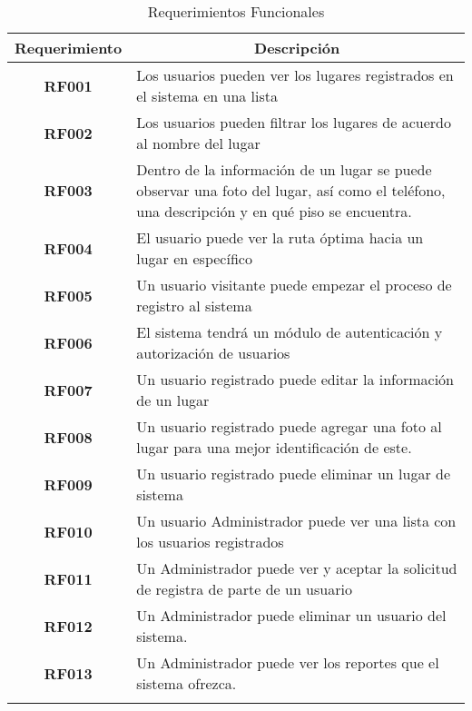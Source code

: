     \begin{longtable}{ c  X }
      \toprule
        \textbf{Requerimiento} &
        \multicolumn{1}{c}{\textbf{Descripción}}\\

      \midrule
      \endhead

\addlinespace
\textbf{RF001}
&
Los usuarios pueden ver los lugares registrados en el sistema en una lista
\\

\addlinespace
\textbf{RF002}
&
Los usuarios pueden filtrar los lugares de acuerdo al nombre del lugar
\\

\addlinespace
\textbf{RF003}
&
Dentro de la información de un lugar se puede observar una foto del lugar, así como el teléfono, una descripción y en qué piso se encuentra.
\\

\addlinespace
\textbf{RF004}
&
El usuario puede ver la ruta óptima hacia un lugar en específico
\\

\addlinespace
\textbf{RF005}
&
Un usuario visitante puede empezar el proceso de registro al sistema
\\


\addlinespace
\textbf{RF006}
&
El sistema tendrá un módulo de autenticación y autorización de usuarios
\\

\addlinespace
\textbf{RF007}
&
Un usuario registrado puede editar la información de un lugar
\\

\addlinespace
\textbf{RF008}
&
Un usuario registrado puede agregar una foto al lugar para una mejor identificación de este.
\\


\addlinespace
\textbf{RF009}
&
Un usuario registrado puede eliminar un lugar de sistema
\\


\addlinespace
\textbf{RF010}
&
Un usuario Administrador puede ver una lista con los usuarios registrados
\\


\addlinespace
\textbf{RF011}
&
Un Administrador puede ver y aceptar la solicitud de registra de parte de un usuario
\\


\addlinespace
\textbf{RF012}
&
Un Administrador puede eliminar un usuario del sistema.
\\

\addlinespace
\textbf{RF013}
&
Un Administrador puede ver los reportes que el sistema ofrezca.
\\


      \bottomrule
      \caption{Requerimientos Funcionales}
      \label{tab:requerimientos funcionales}
    \end{longtable}
